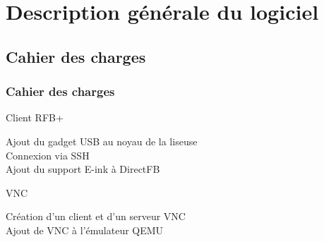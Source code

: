 \section[Description]{Description générale du logiciel}

\subsection{Cahier des charges}


\begin{frame}

 \frametitle{Cahier des charges}


%






%




%
%
%
%


\begin{block}{Client RFB+}

Ajout du gadget USB au noyau de la liseuse\\

Connexion via SSH\\
Ajout du support E-ink à DirectFB\\

\end{block}

\begin{block}{VNC}

Création d'un client et d'un serveur VNC\\

Ajout de VNC à l'émulateur QEMU\\
\end{block}


\end{frame}


